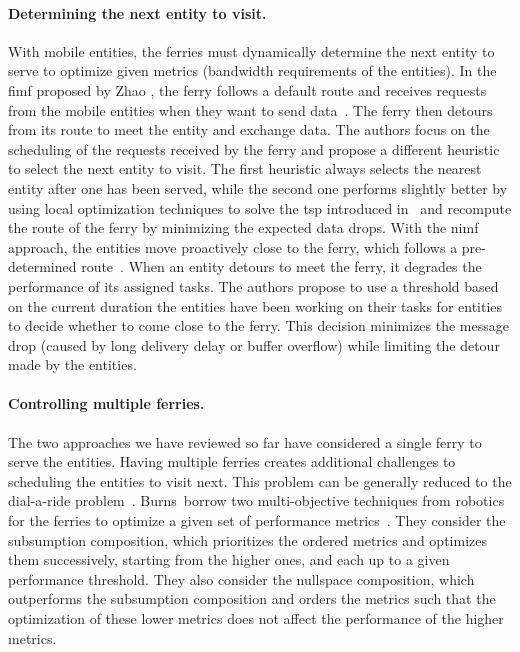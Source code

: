 \paragraph{Determining the next entity to visit.}
With mobile entities, the ferries must dynamically determine the next entity to serve to optimize given metrics (\eg bandwidth requirements of the entities). In the \acrfull{fimf} proposed by Zhao \etal, the ferry follows a default route and receives requests from the mobile entities when they want to send data~\cite{zhao2004message}. The ferry then detours from its route to meet the entity and exchange data. The authors focus on the scheduling of the requests received by the ferry and propose a different heuristic to select the next entity to visit. The first heuristic always selects the nearest entity after one has been served, while the second one performs slightly better by using local optimization techniques to solve the \acrshort{tsp} introduced in~\cite{zhao2003message} and recompute the route of the ferry by minimizing the expected data drops. With the \acrfull{nimf} approach, the entities move proactively close to the ferry, which follows a pre-determined route~\cite{zhao2004message}. When an entity detours to meet the ferry, it degrades the performance of its assigned tasks. The authors propose to use a threshold based on the current duration the entities have been working on their tasks for entities to decide whether to come close to the ferry. This decision minimizes the message drop (caused by long delivery delay or buffer overflow) while limiting the detour made by the entities.

\paragraph{Controlling multiple ferries.}
The two approaches we have reviewed so far have considered a single ferry to serve the entities. Having multiple ferries creates additional challenges to scheduling the entities to visit next. This problem can be generally reduced to the dial-a-ride problem~\cite{savelsbergh1985local}. Burns~\etal borrow two multi-objective techniques from robotics for the ferries to optimize a given set of performance metrics~\cite{burns2005mv,burns2008mora,burns2006autonomous}. They consider the subsumption composition, which prioritizes the ordered metrics and optimizes them successively, starting from the higher ones, and each up to a given performance threshold. They also consider the nullspace composition, which outperforms the subsumption composition and orders the metrics such that the optimization of these lower metrics does not affect the performance of the higher metrics. 

